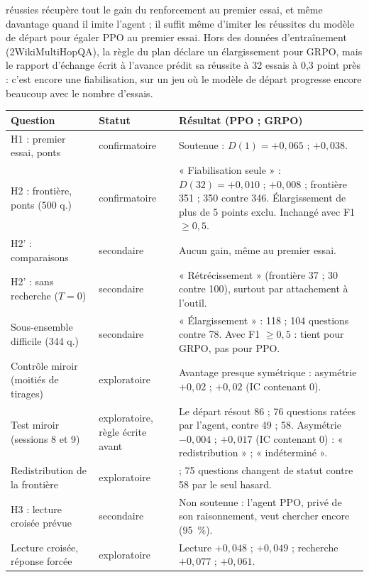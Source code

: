 \documentclass[11pt,a4paper]{article}
\begin{document}
réussies récupère tout le gain du renforcement au premier essai, et même davantage quand il imite l'agent ; il suffit même d'imiter les réussites du modèle de départ pour égaler PPO au premier essai. Hors des données d'entraînement (2WikiMultiHopQA), la règle du plan déclare un élargissement pour GRPO, mais le rapport d'échange écrit à l'avance prédit sa réussite à 32 essais à 0,3 point près : c'est encore une fiabilisation, sur un jeu où le modèle de départ progresse encore beaucoup avec le nombre d'essais.

\begin{table}[h]\centering\footnotesize\renewcommand{\arraystretch}{1.3}
\begin{tabular}{>{\raggedright\arraybackslash}p{3.6cm}>{\raggedright\arraybackslash}p{1.9cm}>{\raggedright\arraybackslash}p{8.6cm}}
\toprule
Question & Statut & Résultat (PPO ; GRPO) \\
\midrule
H1 : premier essai, ponts & confirmatoire & Soutenue : $D(1) = +0{,}065$ ; $+0{,}038$. \\
H2 : frontière, ponts (500 q.) & confirmatoire & « Fiabilisation seule » : $D(32) = +0{,}010$ ; $+0{,}008$ ; frontière 351 ; 350 contre 346. Élargissement de plus de 5 points exclu. Inchangé avec F1 $\geq 0{,}5$. \\
H2' : comparaisons & secondaire & Aucun gain, même au premier essai. \\
H2' : sans recherche ($T = 0$) & secondaire & « Rétrécissement » (frontière 37 ; 30 contre 100), surtout par attachement à l'outil. \\
Sous-ensemble difficile (344 q.) & secondaire & « Élargissement » : 118 ; 104 questions contre 78. Avec F1 $\geq 0{,}5$ : tient pour GRPO, pas pour PPO. \\
Contrôle miroir (moitiés de tirages) & exploratoire & Avantage presque symétrique : asymétrie $+0{,}02$ ; $+0{,}02$ (IC contenant 0). \\
Test miroir (sessions 8 et 9) & exploratoire, règle écrite avant & Le départ résout 86 ; 76 questions ratées par l'agent, contre 49 ; 58. Asymétrie $-0{,}004$ ; $+0{,}017$ (IC contenant 0) : « redistribution » ; « indéterminé ». \\
Redistribution de la frontière & exploratoire & 91 ; 75 questions changent de statut contre 58 par le seul hasard. \\
H3 : lecture croisée prévue & secondaire & Non soutenue : l'agent PPO, privé de son raisonnement, veut chercher encore (95~\%). \\
Lecture croisée, réponse forcée & exploratoire & Lecture $+0{,}048$ ; $+0{,}049$ ; recherche $+0{,}077$ ; $+0{,}061$. \\

\end{tabular}
\end{table}
\end{document}

